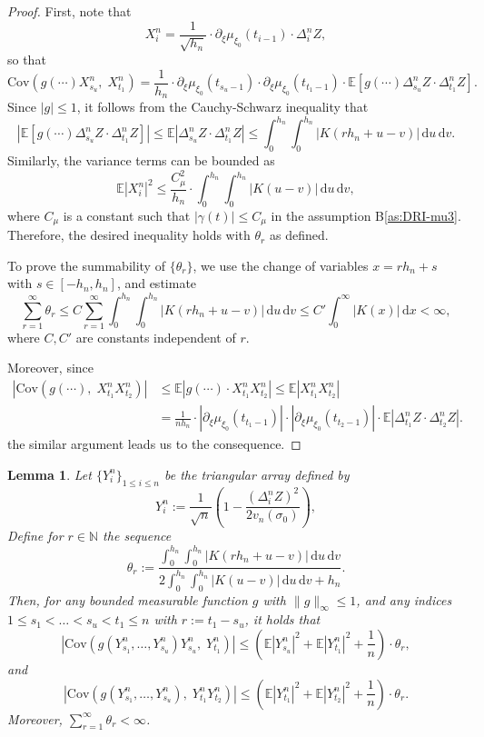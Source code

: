 \documentclass[a4paper,10pt,twoside]{article}
\newtheorem{lem}{Lemma}[section]
\numberwithin{equation}{section}
\def\N{\mathbb{N}}
\def\l{\left}
\def\r{\right}
\def\g{\gamma}
\def\E{\mathbb{E}}
\def\Cov{\mathrm{Cov}}
\def\df{\mathrm{d}}
\begin{document}
\begin{proof}
First, note that
\[
X_i^n = \frac{1}{\sqrt{h_n}} \cdot \partial_\xi \mu_{\xi_0}(t_{i-1}) \cdot \Delta_i^n Z,
\]
so that
\[
\Cov\l( g(\cdots) X_{s_u}^n,\; X_{t_1}^n \r)
= \frac{1}{h_n} \cdot \partial_\xi \mu_{\xi_0}(t_{s_u - 1}) \cdot \partial_\xi \mu_{\xi_0}(t_{t_1 - 1}) \cdot \E\l[ g(\cdots) \Delta_{s_u}^n Z \cdot \Delta_{t_1}^n Z \r].
\]
Since $|g| \le 1$, it follows from the Cauchy-Schwarz inequality that
\[
\l| \E\l[ g(\cdots) \Delta_{s_u}^n Z \cdot \Delta_{t_1}^n Z \r] \r|
\le \E\l| \Delta_{s_u}^n Z \cdot \Delta_{t_1}^n Z \r|
\le \int_0^{h_n} \int_0^{h_n} |K(r h_n + u - v)|\,\df u\,\df v.
\]
Similarly, the variance terms can be bounded as
\[
\E|X_i^n|^2 \le \frac{C_\mu^2}{h_n} \cdot \int_0^{h_n} \int_0^{h_n} |K(u - v)|\,\df u\,\df v, 
\]
where $C_\mu$ is a constant such that $|\g(t)|\le C_\mu$ in the assumption B\ref{as:DRI-mu3}. 
Therefore, the desired inequality holds with $\theta_r$ as defined.

To prove the summability of $\{\theta_r\}$, we use the change of variables $x = r h_n + s$ with $s \in [-h_n, h_n]$, and estimate
\[
\sum_{r=1}^\infty \theta_r
\le C \sum_{r=1}^\infty \int_0^{h_n} \int_0^{h_n} |K(r h_n + u - v)|\,\df u\,\df v
\le C' \int_0^\infty |K(x)|\,\df x < \infty,
\]
where $C, C'$ are constants independent of $r$. 

Moreover, since 
\begin{align*}
\l| \Cov\l( g(\cdots),\; X_{t_1}^n X_{t_2}^n \r) \r|
&\le \E\l| g(\cdots) \cdot X_{t_1}^n X_{t_2}^n \r| \le \E\l| X_{t_1}^n X_{t_2}^n \r| \\
&= \frac{1}{n h_n} \cdot |\partial_\xi \mu_{\xi_0}(t_{t_1 - 1})| \cdot |\partial_\xi \mu_{\xi_0}(t_{t_2 - 1})| \cdot \E\l| \Delta_{t_1}^n Z \cdot \Delta_{t_2}^n Z \r|.
\end{align*}
the similar argument leads us to the consequence. 
\end{proof}


\begin{lem}
\label{lem:cov-bound-summable-Y}
Let $\{Y_i^n\}_{1 \le i \le n}$ be the triangular array defined by
\[
Y_i^n := \frac{1}{\sqrt{n}} \l( 1 - \frac{(\Delta_i^n Z)^2}{2 v_n(\sigma_0)} \r),
\]
Define for $r \in \N$ the sequence
\[
\theta_r := \frac{ \displaystyle \int_0^{h_n} \!\! \int_0^{h_n} |K(r h_n + u - v)|\,\df u\,\df v }{
\displaystyle 2 \int_0^{h_n} \!\! \int_0^{h_n} |K(u - v)|\,\df u\,\df v + h_n }.
\]
Then, for any bounded measurable function $g$ with $\|g\|_\infty \le 1$, and any indices $1 \le s_1 < \dots < s_u < t_1 \le n$ with $r := t_1 - s_u$, it holds that
\[
\l| \Cov\l( g(Y_{s_1}^n, \dots, Y_{s_u}^n) Y_{s_u}^n,\; Y_{t_1}^n \r) \r|
\le \l( \E|Y_{s_u}^n|^2 + \E|Y_{t_1}^n|^2 + \frac{1}{n} \r) \cdot \theta_r,
\]
and
\[
\l| \Cov\l( g(Y_{s_1}^n, \dots, Y_{s_u}^n),\; Y_{t_1}^n Y_{t_2}^n \r) \r|
\le \l( \E|Y_{t_1}^n|^2 + \E|Y_{t_2}^n|^2 + \frac{1}{n} \r) \cdot \theta_r.
\]
Moreover, $\sum_{r=1}^\infty \theta_r < \infty$.
\end{lem}
\end{document}
